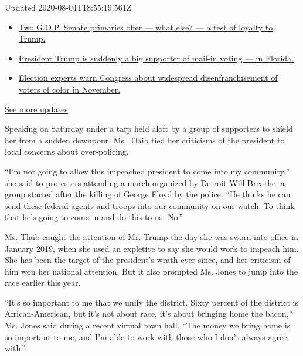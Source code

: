 Updated 2020-08-04T18:55:19.561Z

\begin{itemize}
\tightlist
\item
  \href{https://www.nytimes.com/2020/08/04/us/elections/primary-election-michigan-arizona-kansas.html?action=click\&pgtype=Article\&state=default\&region=MAIN_CONTENT_1\&context=storylines_live_updates\#link-3924dd44}{Two
  G.O.P. Senate primaries offer --- what else? --- a test of loyalty to
  Trump.}
\item
  \href{https://www.nytimes.com/2020/08/04/us/elections/primary-election-michigan-arizona-kansas.html?action=click\&pgtype=Article\&state=default\&region=MAIN_CONTENT_1\&context=storylines_live_updates\#link-32b39e33}{President
  Trump is suddenly a big supporter of mail-in voting --- in Florida.}
\item
  \href{https://www.nytimes.com/2020/08/04/us/elections/primary-election-michigan-arizona-kansas.html?action=click\&pgtype=Article\&state=default\&region=MAIN_CONTENT_1\&context=storylines_live_updates\#link-6d019753}{Election
  experts warn Congress about widespread disenfranchisement of voters of
  color in November.}
\end{itemize}

\href{https://www.nytimes.com/2020/08/04/us/elections/primary-election-michigan-arizona-kansas.html?action=click\&pgtype=Article\&state=default\&region=MAIN_CONTENT_1\&context=storylines_live_updates}{See
more updates}

Speaking on Saturday under a tarp held aloft by a group of supporters to
shield her from a sudden downpour, Ms. Tlaib tied her criticisms of the
president to local concerns about over-policing.

``I'm not going to allow this impeached president to come into my
community,'' she said to protesters attending a march organized by
Detroit Will Breathe, a group started after the killing of George Floyd
by the police. ``He thinks he can send these federal agents and troops
into our community on our watch. To think that he's going to come in and
do this to us. No.''

Ms. Tlaib caught the attention of Mr. Trump the day she was sworn into
office in January 2019, when she used an expletive to say she would work
to impeach him. She has been the target of the president's wrath ever
since, and her criticism of him won her national attention. But it also
prompted Ms. Jones to jump into the race earlier this year.

``It's so important to me that we unify the district. Sixty percent of
the district is African-American, but it's not about race, it's about
bringing home the bacon,'' Ms. Jones said during a recent virtual town
hall. ``The money we bring home is so important to me, and I'm able to
work with those who I don't always agree with.''

